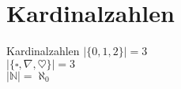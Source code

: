 \section{Kardinalzahlen}

\begin{frame}[c]{Kardinalzahlen}
    \Large
    $|\{0, 1, 2\}| = 3$ \pause \\
    $|\{\square, \nabla, \heartsuit\}| = 3$ \\ \pause
    $|\mathbb{N}| = \aleph_0$
\end{frame}

